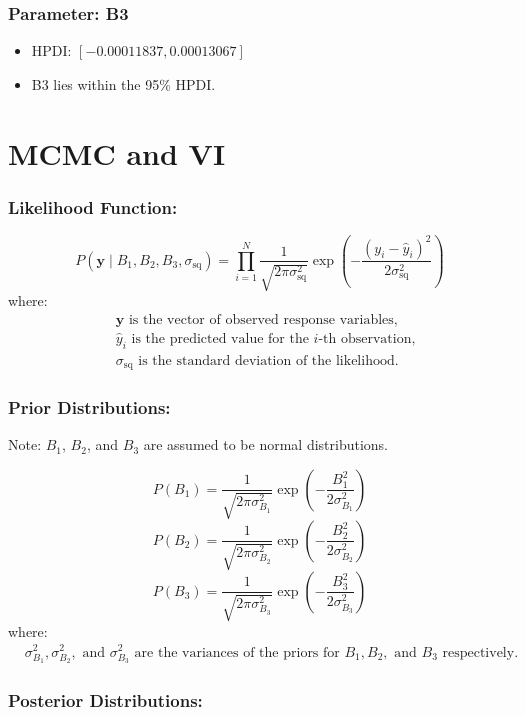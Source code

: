 \documentclass{article}
\begin{document}
\subsubsection{Parameter: B3}
\begin{itemize}
    \item HPDI: $[-0.00011837, 0.00013067]$
    \item B3 lies within the 95\% HPDI.
\end{itemize}


    


\section{MCMC and VI}
\subsubsection*{Likelihood Function:}

\[
P(\mathbf{y} \mid B_1, B_2, B_3, \sigma_{\text{sq}}) = \prod_{i=1}^{N} \frac{1}{\sqrt{2\pi\sigma_{\text{sq}}^2}} \exp\left(-\frac{(y_i - \hat{y}_i)^2}{2\sigma_{\text{sq}}^2}\right)
\]
where:
\begin{align*}
&\mathbf{y} \text{ is the vector of observed response variables,} \\
&\hat{y}_i \text{ is the predicted value for the }i\text{-th observation,} \\
&\sigma_{\text{sq}} \text{ is the standard deviation of the likelihood.}
\end{align*}

\subsubsection*{Prior Distributions:}
Note: \(B_1\), \(B_2\), and \(B_3\) are assumed to be normal distributions.

\[
P(B_1) = \frac{1}{\sqrt{2\pi\sigma_{B_1}^2}} \exp\left(-\frac{B_1^2}{2\sigma_{B_1}^2}\right)
\]
\[
P(B_2) = \frac{1}{\sqrt{2\pi\sigma_{B_2}^2}} \exp\left(-\frac{B_2^2}{2\sigma_{B_2}^2}\right)
\]
\[
P(B_3) = \frac{1}{\sqrt{2\pi\sigma_{B_3}^2}} \exp\left(-\frac{B_3^2}{2\sigma_{B_3}^2}\right)
\]
where:
\begin{align*}
&\sigma_{B_1}^2, \sigma_{B_2}^2, \text{ and } \sigma_{B_3}^2 \text{ are the variances of the priors for }B_1, B_2, \text{ and } B_3 \text{ respectively.}
\end{align*}

\subsubsection*{Posterior Distributions:}
\end{document}
